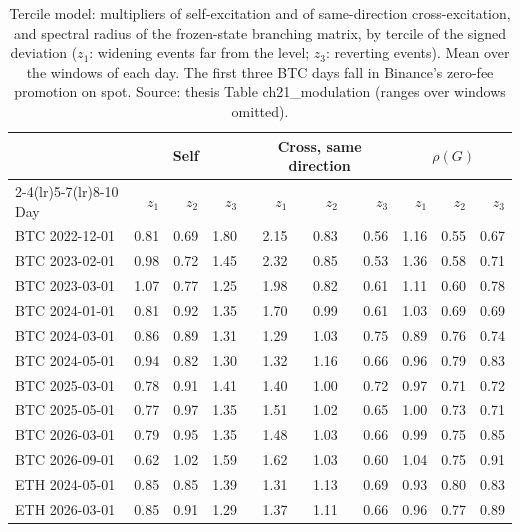 \documentclass[a4paper,11pt]{article}
\begin{document}
\begin{table}[htbp]
\centering
\caption{Tercile model: multipliers of self-excitation and of same-direction cross-excitation, and spectral radius of the frozen-state branching matrix, by tercile of the signed deviation ($z_1$: widening events far from the level; $z_3$: reverting events). Mean over the windows of each day. The first three BTC days fall in Binance's zero-fee promotion on spot. Source: thesis Table ch21\_modulation (ranges over windows omitted).}
\label{tab:mod}
\small
\begin{tabular}{@{}lrrrrrrrrr@{}}
\toprule
 & \multicolumn{3}{c}{Self} & \multicolumn{3}{c}{Cross, same direction} & \multicolumn{3}{c}{$\rho(G)$} \\
\cmidrule(lr){2-4}\cmidrule(lr){5-7}\cmidrule(lr){8-10}
Day & $z_1$ & $z_2$ & $z_3$ & $z_1$ & $z_2$ & $z_3$ & $z_1$ & $z_2$ & $z_3$ \\
\midrule
BTC 2022-12-01 & 0.81 & 0.69 & 1.80 & 2.15 & 0.83 & 0.56 & 1.16 & 0.55 & 0.67 \\
BTC 2023-02-01 & 0.98 & 0.72 & 1.45 & 2.32 & 0.85 & 0.53 & 1.36 & 0.58 & 0.71 \\
BTC 2023-03-01 & 1.07 & 0.77 & 1.25 & 1.98 & 0.82 & 0.61 & 1.11 & 0.60 & 0.78 \\
BTC 2024-01-01 & 0.81 & 0.92 & 1.35 & 1.70 & 0.99 & 0.61 & 1.03 & 0.69 & 0.69 \\
BTC 2024-03-01 & 0.86 & 0.89 & 1.31 & 1.29 & 1.03 & 0.75 & 0.89 & 0.76 & 0.74 \\
BTC 2024-05-01 & 0.94 & 0.82 & 1.30 & 1.32 & 1.16 & 0.66 & 0.96 & 0.79 & 0.83 \\
BTC 2025-03-01 & 0.78 & 0.91 & 1.41 & 1.40 & 1.00 & 0.72 & 0.97 & 0.71 & 0.72 \\
BTC 2025-05-01 & 0.77 & 0.97 & 1.35 & 1.51 & 1.02 & 0.65 & 1.00 & 0.73 & 0.71 \\
BTC 2026-03-01 & 0.79 & 0.95 & 1.35 & 1.48 & 1.03 & 0.66 & 0.99 & 0.75 & 0.85 \\
BTC 2026-09-01 & 0.62 & 1.02 & 1.59 & 1.62 & 1.03 & 0.60 & 1.04 & 0.75 & 0.91 \\
ETH 2024-05-01 & 0.85 & 0.85 & 1.39 & 1.31 & 1.13 & 0.69 & 0.93 & 0.80 & 0.83 \\
ETH 2026-03-01 & 0.85 & 0.91 & 1.29 & 1.37 & 1.11 & 0.66 & 0.96 & 0.77 & 0.89 \\
\bottomrule
\end{tabular}
\end{table}
\end{document}
